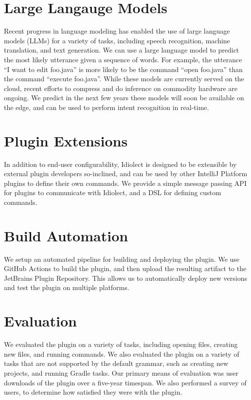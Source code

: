 \documentclass[conference]{IEEEtran}
\begin{document}
\section{Large Langauge Models}

Recent progress in language modeling has enabled the use of large language models (LLMs) for a variety of tasks, including speech recognition, machine translation, and text generation. We can use a large language model to predict the most likely utterance given a sequence of words. For example, the utterance ``I want to edit foo.java'' is more likely to be the command ``open foo.java'' than the command ``execute foo.java''. While these models are currently served on the cloud, recent efforts to compress and do inference on commodity hardware are ongoing. We predict in the next few years these models will soon be available on the edge, and can be used to perform intent recognition in real-time.

\section{Plugin Extensions}

In addition to end-user configurability, Idiolect is designed to be extensible by external plugin developers so-inclined, and can be used by other IntelliJ Platform plugins to define their own commands. We provide a simple message passing API for plugins to communicate with Idiolect, and a DSL for defining custom commands.

\section{Build Automation}

We setup an automated pipeline for building and deploying the plugin. We use GitHub Actions to build the plugin, and then upload the resulting artifact to the JetBrains Plugin Repository. This allows us to automatically deploy new versions and test the plugin on multiple platforms.

\section{Evaluation}

We evaluated the plugin on a variety of tasks, including opening files, creating new files, and running commands. We also evaluated the plugin on a variety of tasks that are not supported by the default grammar, such as creating new projects, and running Gradle tasks. Our primary means of evaluation was user downloads of the plugin over a five-year timespan. We also performed a survey of users, to determine how satisfied they were with the plugin.
\end{document}
